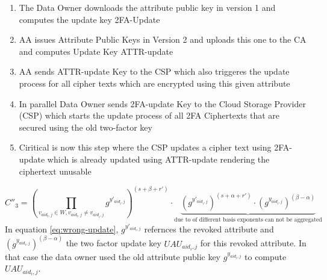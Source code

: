 \begin{enumerate}
\item The Data Owner downloads the attribute public key in version 1 and computes the update key 2FA-Update
\item AA issues Attribute Public Keys in Version 2 and uploads this one to the CA and computes Update Key ATTR-update
\item AA sends ATTR-update Key to the CSP which also triggeres the update process for all cipher texts which are encrypted using this given attribute 
\item In parallel Data Owner sends 2FA-update Key to the Cloud Storage Provider (CSP) which starts the update process of all 2FA Ciphertexts that are secured using the old two-factor key
\item Ciritical is now this step where the CSP updates a cipher text using 2FA-update which is already updated using ATTR-update rendering the ciphertext unusable
\end{enumerate}

\begin{equation}
C''_3 = 
\left(\prod_{v_{aid_{t},j} \in W, v_{aid_{t},j} \neq v_{aid_{i},j}} g^{y'_{aid_i,j}} \right)^{(s+\beta+r')}
\cdot 
\underbrace{
    \left(g^{y'_{aid_i,j}}\right)^{(s + \alpha + r')} 
    \cdot 
    \left(g^{y_{aid_i,j}}\right)^{(\beta - \alpha)} 
}_\text{due to of different basis exponents can not be aggregated} 
\label{eq:wrong-update}
\end{equation}
In equation \ref{eq:wrong-update}, $g^{y'_{aid_i,j}}$ refernces the revoked attribute and $\left(g^{y_{aid_i,j}}\right)^{(\beta - \alpha)}$ the two factor update key $UAU_{aid_i,j}$ for this revoked attribute. In that case the data owner used the old attribute public key $g^{y_{aid_i,j}}$ to compute $UAU_{aid_i,j}$.